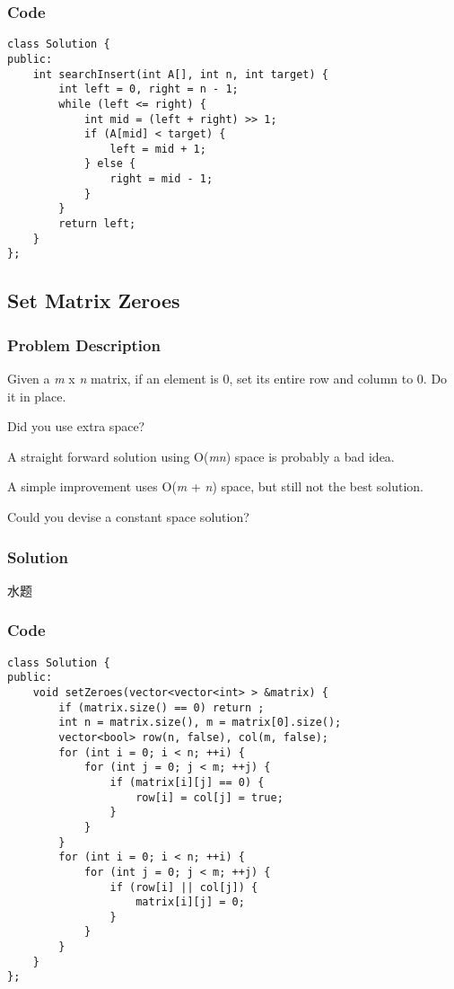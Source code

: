 \documentclass[courier]{article}
\begin{document}
\begin{CJK*}{UTF8}{gkai}
\subsubsection*{Code}
\begin{lstlisting}
class Solution {
public:
    int searchInsert(int A[], int n, int target) {
        int left = 0, right = n - 1;
        while (left <= right) {
            int mid = (left + right) >> 1;
            if (A[mid] < target) {
                left = mid + 1;
            } else {
                right = mid - 1;
            }
        }
        return left;
    }
}; 
\end{lstlisting}


\subsection{ Set Matrix Zeroes }

\subsubsection*{Problem Description}
Given a \emph{m} x \emph{n} matrix, if an element is 0, set its entire row and column to 0. Do it in place.

Did you use extra space?


A straight forward solution using O(\emph{m}\emph{n}) space is probably a bad idea.


A simple improvement uses O(\emph{m} + \emph{n}) space, but still not the best solution.


Could you devise a constant space solution?



\subsubsection*{Solution}
水题

\subsubsection*{Code}
\begin{lstlisting}
class Solution {
public:
    void setZeroes(vector<vector<int> > &matrix) {
        if (matrix.size() == 0) return ;
        int n = matrix.size(), m = matrix[0].size();
        vector<bool> row(n, false), col(m, false);
        for (int i = 0; i < n; ++i) {
            for (int j = 0; j < m; ++j) {
                if (matrix[i][j] == 0) {
                    row[i] = col[j] = true;
                }
            }
        }
        for (int i = 0; i < n; ++i) {
            for (int j = 0; j < m; ++j) {
                if (row[i] || col[j]) {
                    matrix[i][j] = 0;
                }
            }
        }
    }
}; 
\end{lstlisting}



\end{CJK*}
\end{document}
